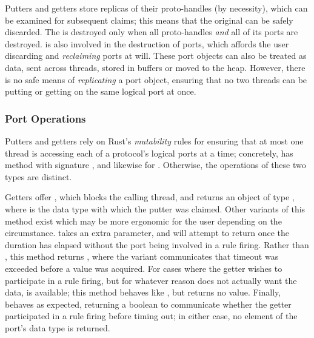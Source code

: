 Putters and getters store replicas of their proto-handles (by necessity), which can be examined for subsequent claims; this means that the original  can be safely discarded. The  is destroyed only when all proto-handles \textit{and} all of its ports are destroyed.  is also involved in the destruction of ports, which affords the user discarding and \textit{reclaiming} ports at will. These port objects can also be treated as data, sent across threads, stored in buffers or moved to the heap. However, there is no safe means of \textit{replicating} a port object, ensuring that no two threads can be putting or getting on the same logical port at once.


\subsubsection{Port Operations}
\label{sec:port_operations}
Putters and getters rely on Rust's \textit{mutability} rules for ensuring that at most one thread is accessing each of a protocol's logical ports at a time; concretely,  has method  with signature , and likewise for . Otherwise, the operations of these two types are distinct.

Getters offer , which blocks the calling thread, and returns an object of type , where  is the data type with which the putter was claimed. Other variants of this method exist which may be more ergonomic for the user depending on the circumstance.  takes an extra  parameter, and will attempt to return once the duration has elapsed without the port being involved in a rule firing. Rather than , this method returns , where the  variant communicates that timeout was exceeded before a value was acquired. For cases where the getter wishes to participate in a rule firing, but for whatever reason does not actually want the data,  is available; this method behaves like , but returns no value. Finally,  behaves as expected, returning a boolean  to communicate whether the getter participated in a rule firing before timing out; in either case, no element of the port's data type is returned.

